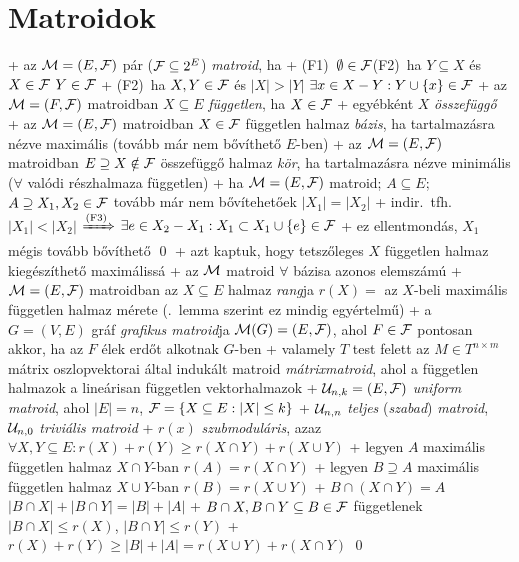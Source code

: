 \section{Matroidok}


+ \dfn az $\mathcal{M} = (E, \mathcal{F})$ pár ($\mathcal{F} \subseteq 2^E$) \emph{matroid},
  ha
  + (F1)~$\emptyset \in \mathcal{F}$\qquad(F2)~ha $Y \subseteq X$ és $X \in
    \mathcal{F}$ \RA $Y \in \mathcal{F}$
  + (F2)~ha $X, Y \in \mathcal{F}$ és $\lvert X \rvert > \lvert Y \rvert$ \RA
    $\exists x \in X - Y : Y \cup \{ x \} \in \mathcal{F}$
+ \dfn az $\mathcal{M} = (F, \mathcal{F})$ matroidban $X \subseteq E$
  \emph{független}, ha $X \in \mathcal{F}$
  + egyébként $X$ \emph{összefüggő}
+ \dfn az $\mathcal{M} = (E, \mathcal{F})$ matroidban $X \in \mathcal{F}$ független
  halmaz \emph{bázis}, ha tartalmazásra nézve maximális (tovább már
  nem bővíthető $E$-ben)
+ \dfn az $\mathcal{M} = (E, \mathcal{F})$ matroidban $E \supseteq X \notin \mathcal{F}$
  összefüggő halmaz \emph{kör}, ha tartalmazásra nézve minimális
  ($\forall$ valódi részhalmaza független)
+ \lemma \label{lem:matroid:def:meret}ha $\mathcal{M} = (E, \mathcal{F})$ matroid; $A
  \subseteq E$; $A \supseteq X_1, X_2 \in \mathcal{F}$ tovább már nem
  bővítehetőek \RA $\lvert X_1 \rvert = \lvert X_2 \rvert$
  + \proof indir.~tfh.~$\lvert X_1 \rvert < \lvert X_2 \rvert$
    $\xRightarrow{\text{(F3)}}$ $\exists e \in X_2 - X_1 : X_1
    \subset X_1 \cup \{ e \} \in \mathcal{F}$
  + ez ellentmondás, $X_1$ mégis tovább bővíthető \qed
  + azt kaptuk, hogy tetszőleges $X$ független halmaz kiegészíthető
    maximálissá
+ \corr az $\mathcal{M}$ matroid $\forall$ bázisa azonos elemszámú
+ \dfn $\mathcal{M} = (E, \mathcal{F})$ matroidban az $X \subseteq E$ halmaz
  \emph{rang}ja $r(X) =$ az $X$-beli maximális független halmaz mérete
  (.~lemma szerint ez mindig egyértelmű)
+ \example  a $G = (V, E)$ gráf \emph{grafikus matroid}ja $\mathcal{M}(G) =
  (E, \mathcal{F})$, ahol $F \in \mathcal{F}$ pontosan akkor, ha az $F$ élek erdőt
  alkotnak $G$-ben
+ \example valamely $T$ test felett az $M \in T^{n \times m}$ mátrix
  oszlopvektorai által indukált matroid \emph{mátrixmatroid}, ahol
  a független halmazok a lineárisan független vektorhalmazok
+ $\mathcal{U}_{n, k} = (E, \mathcal{F})$ \emph{uniform matroid}, ahol $\lvert E
  \rvert = n$, $\mathcal{F} = \{ X \subseteq E : \lvert X \rvert \le k \}$
  + $\mathcal{U}_{n, n}$ \emph{teljes} (\emph{szabad}) \emph{matroid},
    $\mathcal{U}_{n, 0}$ \emph{triviális matroid}
+ \thm \label{thm:matroid:def:submod}$r(x)$ \emph{szubmoduláris}, azaz
  $\forall X, Y \subseteq E: r(X) + r(Y) \ge r(X \cap Y) + r(X \cup Y)$
  + \proof legyen $A$ maximális független halmaz $X \cap Y$-ban
    \RA $r(A) = r(X \cap Y)$
  + legyen $B \supseteq A$ maximális független halmaz $X \cup Y$-ban
    \RA $r(B) = r(X \cup Y)$
  + $B \cap (X \cap Y) = A$ \RA $\lvert B \cap X \rvert + \lvert B
    \cap Y \rvert = \lvert B \rvert + \lvert A \rvert$
  + $B \cap X, B \cap Y \subseteq B \in \mathcal{F}$ függetlenek \RA%
    $\lvert B \cap X \rvert \le r(X)$, $\lvert B \cap Y \rvert \le
    r(Y)$
  + $r(X) + r(Y) \ge \lvert B \rvert + \lvert A \rvert = r(X \cup Y) +
    r(X \cap Y)$ \qed

